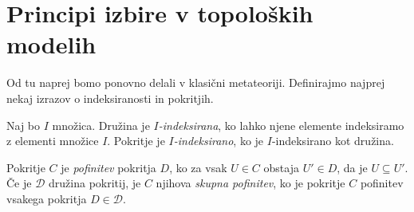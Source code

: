 \section{Principi izbire v topoloških modelih}\label{sec:izbire}

Od tu naprej bomo ponovno delali v klasični metateoriji. Definirajmo najprej
nekaj izrazov o indeksiranosti in pokritjih.
\begin{definicija}
  Naj bo \(I\) množica. Družina je \emph{\(I\)-indeksirana}, ko lahko njene
  elemente indeksiramo z elementi množice \(I\). Pokritje je
  \emph{\(I\)-indeksirano}, ko je \(I\)-indeksirano kot družina.
\end{definicija}
\begin{definicija}
  Pokritje \(C\) je \emph{pofinitev} pokritja \(D\), ko za vsak \(U ∈ C\)
  obstaja \(U' ∈ D\), da je \(U ⊆ U'\).
  Če je \(𝒟\) družina pokritij, je \(C\) njihova \emph{skupna pofinitev}, ko je
  pokritje \(C\) pofinitev vsakega pokritja \(D ∈ 𝒟\).
\end{definicija}

